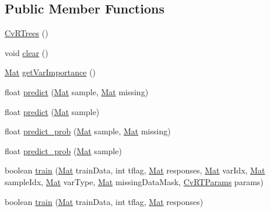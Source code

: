 \subsection*{Public Member Functions}
\begin{DoxyCompactItemize}
\item 
\mbox{\hyperlink{classorg_1_1opencv_1_1ml_1_1_cv_r_trees_ae161397de026b23f326f7fa926557f28}{Cv\+R\+Trees}} ()
\item 
void \mbox{\hyperlink{classorg_1_1opencv_1_1ml_1_1_cv_r_trees_afc153789837700011161eca7606383f9}{clear}} ()
\item 
\mbox{\hyperlink{classorg_1_1opencv_1_1core_1_1_mat}{Mat}} \mbox{\hyperlink{classorg_1_1opencv_1_1ml_1_1_cv_r_trees_a509bd837e63864c7006cd17765f97912}{get\+Var\+Importance}} ()
\item 
float \mbox{\hyperlink{classorg_1_1opencv_1_1ml_1_1_cv_r_trees_a3c383d14585b25b186ceb69e160a1511}{predict}} (\mbox{\hyperlink{classorg_1_1opencv_1_1core_1_1_mat}{Mat}} sample, \mbox{\hyperlink{classorg_1_1opencv_1_1core_1_1_mat}{Mat}} missing)
\item 
float \mbox{\hyperlink{classorg_1_1opencv_1_1ml_1_1_cv_r_trees_a8d822b48ef528eaf388113c5a6f04b96}{predict}} (\mbox{\hyperlink{classorg_1_1opencv_1_1core_1_1_mat}{Mat}} sample)
\item 
float \mbox{\hyperlink{classorg_1_1opencv_1_1ml_1_1_cv_r_trees_a5ba49f88f868945486251c6bbf04755c}{predict\+\_\+prob}} (\mbox{\hyperlink{classorg_1_1opencv_1_1core_1_1_mat}{Mat}} sample, \mbox{\hyperlink{classorg_1_1opencv_1_1core_1_1_mat}{Mat}} missing)
\item 
float \mbox{\hyperlink{classorg_1_1opencv_1_1ml_1_1_cv_r_trees_a38b12f73af868829d57f23f4c365ad83}{predict\+\_\+prob}} (\mbox{\hyperlink{classorg_1_1opencv_1_1core_1_1_mat}{Mat}} sample)
\item 
boolean \mbox{\hyperlink{classorg_1_1opencv_1_1ml_1_1_cv_r_trees_a016b976743279598c4ce0ffb9b52b7f1}{train}} (\mbox{\hyperlink{classorg_1_1opencv_1_1core_1_1_mat}{Mat}} train\+Data, int tflag, \mbox{\hyperlink{classorg_1_1opencv_1_1core_1_1_mat}{Mat}} responses, \mbox{\hyperlink{classorg_1_1opencv_1_1core_1_1_mat}{Mat}} var\+Idx, \mbox{\hyperlink{classorg_1_1opencv_1_1core_1_1_mat}{Mat}} sample\+Idx, \mbox{\hyperlink{classorg_1_1opencv_1_1core_1_1_mat}{Mat}} var\+Type, \mbox{\hyperlink{classorg_1_1opencv_1_1core_1_1_mat}{Mat}} missing\+Data\+Mask, \mbox{\hyperlink{classorg_1_1opencv_1_1ml_1_1_cv_r_t_params}{Cv\+R\+T\+Params}} params)
\item 
boolean \mbox{\hyperlink{classorg_1_1opencv_1_1ml_1_1_cv_r_trees_acb232fd7af5274af21e3e1963c5498a7}{train}} (\mbox{\hyperlink{classorg_1_1opencv_1_1core_1_1_mat}{Mat}} train\+Data, int tflag, \mbox{\hyperlink{classorg_1_1opencv_1_1core_1_1_mat}{Mat}} responses)
\end{DoxyCompactItemize}
